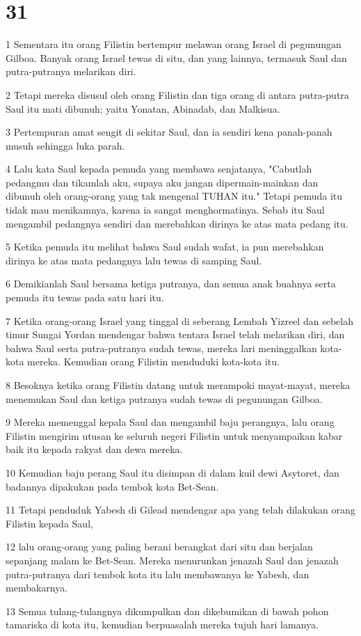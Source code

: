 \chapter{31}

\par 1 Sementara itu orang Filistin bertempur melawan orang Israel di pegunungan Gilboa. Banyak orang Israel tewas di situ, dan yang lainnya, termasuk Saul dan putra-putranya melarikan diri.
\par 2 Tetapi mereka disusul oleh orang Filistin dan tiga orang di antara putra-putra Saul itu mati dibunuh; yaitu Yonatan, Abinadab, dan Malkisua.
\par 3 Pertempuran amat sengit di sekitar Saul, dan ia sendiri kena panah-panah musuh sehingga luka parah.
\par 4 Lalu kata Saul kepada pemuda yang membawa senjatanya, "Cabutlah pedangmu dan tikamlah aku, supaya aku jangan dipermain-mainkan dan dibunuh oleh orang-orang yang tak mengenal TUHAN itu." Tetapi pemuda itu tidak mau menikamnya, karena ia sangat menghormatinya. Sebab itu Saul mengambil pedangnya sendiri dan merebahkan dirinya ke atas mata pedang itu.
\par 5 Ketika pemuda itu melihat bahwa Saul sudah wafat, ia pun merebahkan dirinya ke atas mata pedangnya lalu tewas di samping Saul.
\par 6 Demikianlah Saul bersama ketiga putranya, dan semua anak buahnya serta pemuda itu tewas pada satu hari itu.
\par 7 Ketika orang-orang Israel yang tinggal di seberang Lembah Yizreel dan sebelah timur Sungai Yordan mendengar bahwa tentara Israel telah melarikan diri, dan bahwa Saul serta putra-putranya sudah tewas, mereka lari meninggalkan kota-kota mereka. Kemudian orang Filistin menduduki kota-kota itu.
\par 8 Besoknya ketika orang Filistin datang untuk merampoki mayat-mayat, mereka menemukan Saul dan ketiga putranya sudah tewas di pegunungan Gilboa.
\par 9 Mereka memenggal kepala Saul dan mengambil baju perangnya, lalu orang Filistin mengirim utusan ke seluruh negeri Filistin untuk menyampaikan kabar baik itu kepada rakyat dan dewa mereka.
\par 10 Kemudian baju perang Saul itu disimpan di dalam kuil dewi Asytoret, dan badannya dipakukan pada tembok kota Bet-Sean.
\par 11 Tetapi penduduk Yabesh di Gilead mendengar apa yang telah dilakukan orang Filistin kepada Saul,
\par 12 lalu orang-orang yang paling berani berangkat dari situ dan berjalan sepanjang malam ke Bet-Sean. Mereka menurunkan jenazah Saul dan jenazah putra-putranya dari tembok kota itu lalu membawanya ke Yabesh, dan membakarnya.
\par 13 Semua tulang-tulangnya dikumpulkan dan dikebumikan di bawah pohon tamariska di kota itu, kemudian berpuasalah mereka tujuh hari lamanya.


